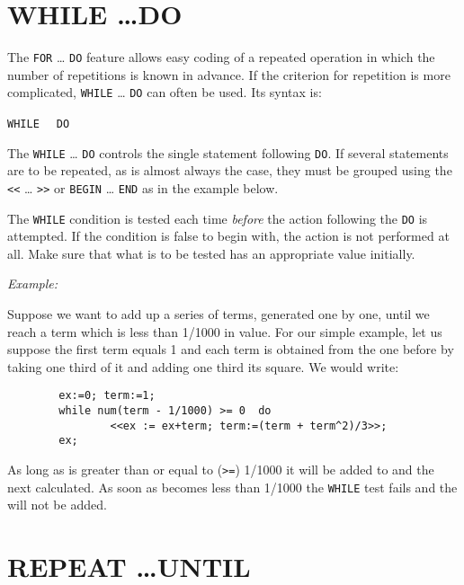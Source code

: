 \section{WHILE \ldots DO}
\hypertarget{command:WHILE}{}

The \texttt{FOR} \ldots{} \texttt{DO} feature
allows easy coding of a repeated operation in which the number of repetitions
is known in advance.  If the criterion for repetition is more complicated,
\texttt{WHILE} \ldots{} \texttt{DO} can often be used.  Its syntax is:
\begin{syntax}
      \texttt{WHILE } \texttt{ DO }
\end{syntax}
The \texttt{WHILE} \ldots{} \texttt{DO} controls the single statement
following \texttt{DO}.
If several statements are to be repeated, as is almost always the case,
they must be grouped using the \texttt{<}\texttt{<} \ldots{} \texttt{>}\texttt{>} 
or \texttt{BEGIN} \ldots{} \texttt{END}
as in the example below.

The \texttt{WHILE} condition is tested each time \emph{before} the action
following the \texttt{DO} is attempted.  If the condition is false to begin
with, the action is not performed at all.  Make sure that what is to be
tested has an appropriate value initially.

\textit{Example:}

Suppose we want to add up a series of terms, generated one by one, until
we reach a term which is less than 1/1000 in value.  For our simple
example, let us suppose the first term equals 1 and each term is obtained
from the one before by taking one third of it and adding one third its
square. We would write:
\begin{verbatim}
        ex:=0; term:=1;
        while num(term - 1/1000) >= 0  do
                <<ex := ex+term; term:=(term + term^2)/3>>;
        ex;
\end{verbatim}
As long as  is greater than or equal to (\texttt{>=}) 1/1000 it will
be added to  and the next  calculated.  As soon as
 becomes less than 1/1000 the \texttt{WHILE} test fails and the
 will not be added.


\section{REPEAT \ldots UNTIL}
\hypertarget{command:REPEAT}{}
\hypertarget{reserved:UNTIL}{}

